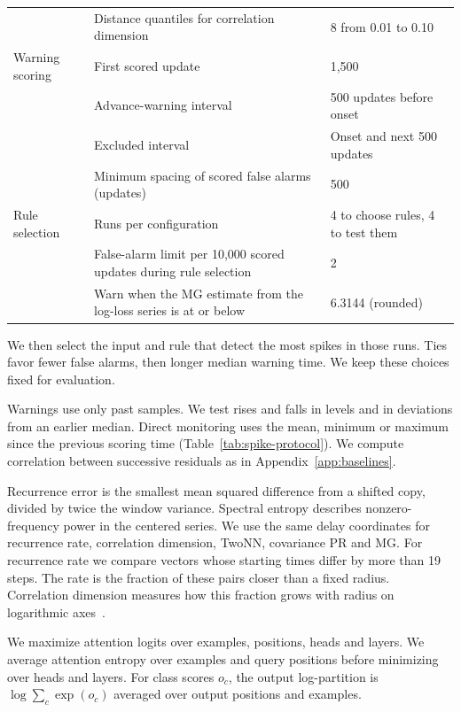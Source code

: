 {\begin{table}[!htbp]
\begin{tabularx}{\linewidth}{@{}l>{\raggedright\arraybackslash}Xl@{}}
 & Distance quantiles for correlation dimension & 8 from 0.01 to 0.10 \\
\addlinespace
Warning scoring & First scored update & 1,500 \\
 & Advance-warning interval & 500 updates before onset \\
 & Excluded interval & Onset and next 500 updates \\
 & Minimum spacing of scored false alarms (updates) & 500 \\
\addlinespace
Rule selection & Runs per configuration & 4 to choose rules, 4 to test them \\
 & False-alarm limit per 10,000 scored updates during rule selection & 2 \\
 & Warn when the MG estimate from the log-loss series is at or below & 6.3144 (rounded) \\
\bottomrule
\end{tabularx}
\end{table}

 We then select the input and rule that detect the most spikes in those runs. Ties favor fewer false alarms, then longer median warning time. We keep these choices fixed for evaluation.

Warnings use only past samples. We test rises and falls in levels and in deviations from an earlier median. Direct monitoring uses the mean, minimum or maximum since the previous scoring time (Table~\ref{tab:spike-protocol}). We compute correlation between successive residuals as in Appendix~\ref{app:baselines}.

Recurrence error is the smallest mean squared difference from a shifted copy, divided by twice the window variance. Spectral entropy describes nonzero-frequency power in the centered series. We use the same delay coordinates for recurrence rate, correlation dimension, TwoNN, covariance PR and MG. For recurrence rate we compare vectors whose starting times differ by more than 19 steps. The rate is the fraction of these pairs closer than a fixed radius. Correlation dimension measures how this fraction grows with radius on logarithmic axes~\citep{grassberger1983measuring}.

We maximize attention logits over examples, positions, heads and layers. We average attention entropy over examples and query positions before minimizing over heads and layers. For class scores $o_c$, the output log-partition is $\log\sum_c\exp(o_c)$ averaged over output positions and examples.

}
